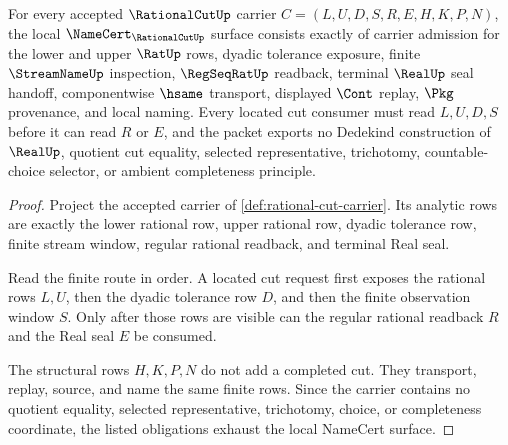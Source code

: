 \begin{theorem}
\label{thm:rational-cut-namecert-obligations}
For every accepted $\RationalCutUp$ carrier $C=(L,U,D,S,R,E,H,K,P,N)$, the local $\NameCert_{\RationalCutUp}$ surface consists exactly of carrier admission for the lower and upper $\RatUp$ rows, dyadic tolerance exposure, finite $\StreamNameUp$ inspection, $\RegSeqRatUp$ readback, terminal $\RealUp$ seal handoff, componentwise $\hsame$ transport, displayed $\Cont$ replay, $\Pkg$ provenance, and local naming. Every located cut consumer must read $L,U,D,S$ before it can read $R$ or $E$, and the packet exports no Dedekind construction of $\RealUp$, quotient cut equality, selected representative, trichotomy, countable-choice selector, or ambient completeness principle.
\end{theorem}
\begin{proof}
Project the accepted carrier of \autoref{def:rational-cut-carrier}. Its analytic rows are exactly the lower rational row, upper rational row, dyadic tolerance row, finite stream window, regular rational readback, and terminal Real seal.

Read the finite route in order. A located cut request first exposes the rational rows $L,U$, then the dyadic tolerance row $D$, and then the finite observation window $S$. Only after those rows are visible can the regular rational readback $R$ and the Real seal $E$ be consumed.

The structural rows $H,K,P,N$ do not add a completed cut. They transport, replay, source, and name the same finite rows. Since the carrier contains no quotient equality, selected representative, trichotomy, choice, or completeness coordinate, the listed obligations exhaust the local NameCert surface.
\end{proof}


